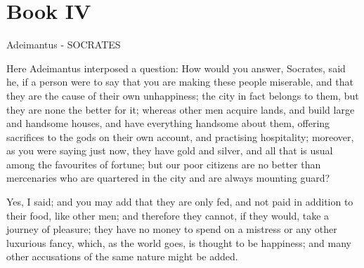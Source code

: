 \chapter{Book IV}

Adeimantus - SOCRATES

Here Adeimantus interposed a question: How would you answer, Socrates, said he, if a person were to say that you are making these people miserable, and that they are the cause of their own unhappiness; the city in fact belongs to them, but they are none the better for it; whereas other men acquire lands, and build large and handsome houses, and have everything handsome about them, offering sacrifices to the gods on their own account, and practising hospitality; moreover, as you were saying just now, they have gold and silver, and all that is usual among the favourites of fortune; but our poor citizens are no better than mercenaries who are quartered in the city and are always mounting guard?

Yes, I said; and you may add that they are only fed, and not paid in addition to their food, like other men; and therefore they cannot, if they would, take a journey of pleasure; they have no money to spend on a mistress or any other luxurious fancy, which, as the world goes, is thought to be happiness; and many other accusations of the same nature might be added.

